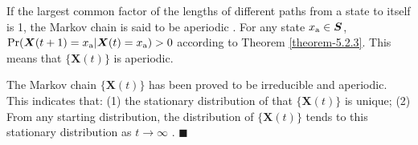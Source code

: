 \documentclass[lettersize,journal]{IEEEtran}
\newcommand{\qedblacksquare}{\hfill $\blacksquare$}
\begin{document}
{If the largest common factor of the lengths of different paths from a state to itself is 1, the Markov chain is said to be aperiodic \cite{A27_book_ElementOfInformationTheory}. For any state $x_{\rm a}\in \boldsymbol{S}$, ${\rm Pr}( \boldsymbol{X}(t+1) = x_{\rm a} | \boldsymbol{X}(t) = x_{\rm a}) > 0$ according to Theorem \ref{theorem-5.2.3}. This means that $\{\boldsymbol{X}(t)\}$ is aperiodic.

The Markov chain $\{\boldsymbol{X}(t)\}$ has been proved to be irreducible and aperiodic. This indicates that: (1) the stationary distribution of that $\{\boldsymbol{X}(t)\}$ is unique; (2) From any starting distribution, the distribution of $\{\boldsymbol{X}(t)\}$ tends to this stationary distribution as $t\to \infty$ \cite{A27_book_ElementOfInformationTheory}. \qedblacksquare

}






% 
%
%



\end{document}
